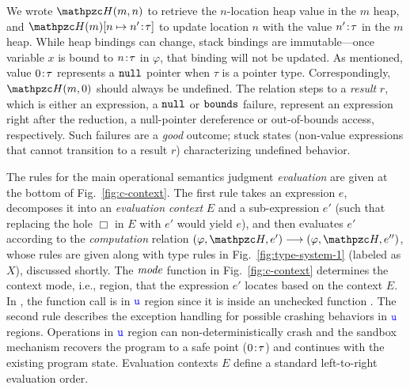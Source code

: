 We wrote $\heap(m,n)$ to retrieve the $n$-location heap value in the $m$ heap,
and $\heapup{m}{n}{\evalue{n'}{\tau}}$ 
to update location $n$ with the value ${n'}\!:\!{\tau}$ in the $m$ heap.
While heap bindings can change, stack bindings are immutable---once
variable $x$ is bound to ${n}\!:\!{\tau}$ in $\varphi$, that binding will not
be updated. 
As mentioned, value ${0}\!:\!{\tau}$
represents a $\mathtt{null}$ pointer when $\tau$ is a pointer type.
Correspondingly, $\heap(m,0)$ should always be undefined.
% 
The relation steps to a \emph{result} $r$, which is either an
expression, a $\mathtt{null}$ or $\mathtt{bounds}$ failure, represent an expression right
  after the reduction, a null-pointer dereference or out-of-bounds access,
respectively.
% 
Such failures are a \emph{good} outcome; stuck states
(non-value expressions that cannot transition to a result $r$)
characterizing undefined behavior.

The rules for the main operational semantics
judgment \emph{evaluation} are given at the bottom of
Fig.~\ref{fig:c-context}.
The first rule takes an expression $e$, decomposes
it into an \emph{evaluation context} $E$ and a sub-expression $e'$
(such that replacing the hole $\Box$ in $E$ with $e'$ would yield
$e$), and then evaluates $e'$ according to the \emph{computation}
  relation $(\varphi,\heap,e') \longrightarrow (\varphi,\heap,e'')$,
whose rules are given along with type rules in Fig.~\ref{fig:type-system-1} (labeled as $X$), discussed
shortly.
The $\textit{mode}$ function in Fig.~\ref{fig:c-context}
determines the context mode, i.e., region, that the expression $e'$ locates based on the context $E$.
In , the function call  is in $\textcolor{blue}{\texttt{u}}$ region since it is inside an unchecked function .
The second rule describes the exception handling 
for possible crashing behaviors in $\textcolor{blue}{\texttt{u}}$ regions.
Operations in $\textcolor{blue}{\texttt{u}}$ region can non-deterministically crash
and the \systemname sandbox mechanism recovers
the program to a safe point (${0}\!:\!{\tau}$)
and continues with the existing program state.
Evaluation contexts $E$ define a standard left-to-right evaluation order. 

